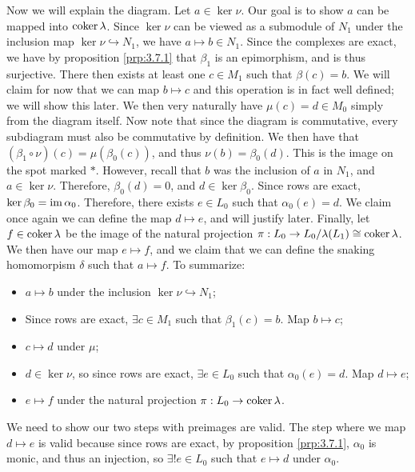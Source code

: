 Now we will explain the diagram. Let $a\in \ker \nu $. Our goal is to show $a$ can be mapped into $\operatorname{coker} \lambda $. Since $\ker \nu $ can be viewed as a submodule of $N_1$ under the inclusion map $\ker \nu \hookrightarrow N_1$, we have $a\mapsto b\in N_1$. Since the complexes are exact, we have by proposition \ref{prp:3.7.1} that $\beta _1$ is an epimorphism, and is thus surjective. There then exists at least one $c\in M_1$ such that $\beta (c)=b$. We will claim for now that we can map $b\mapsto c$ and this operation is in fact well defined; we will show this later. We then very naturally have $\mu (c)=d\in M_0$ simply from the diagram itself. Now note that since the diagram is commutative, every subdiagram must also be commutative by definition. We then have that $(\beta_1\circ \nu) (c)=\mu (\beta _0(c))$, and thus $\nu (b)=\beta _0(d)$. This is the image on the spot marked $*$. However, recall that $b$ was the inclusion of $a$ in $N_1$, and $a\in \ker \nu $. Therefore, $\beta_0(d)=0$, and $d\in \ker \beta _0$. Since rows are exact, $\ker \beta _0= \operatorname{im} \alpha _0$. Therefore, there exists $e\in L_0$ such that  $\alpha _0(e)=d$. We claim once again we can define the map $d\mapsto e$, and will justify later. Finally, let $f\in \operatorname{coker} \lambda $ be the image of the natural projection $\pi : L_0 \to L_0 / \lambda (L_1) \cong \operatorname{coker} \lambda $. We then have our map $e\mapsto f$, and we claim that we can define the snaking homomorpism $\delta$ such that $a\mapsto f$. To summarize:
\begin{itemize}
	\item $a\mapsto b$ under the inclusion $\ker \nu \hookrightarrow N_1$;
	\item  Since rows are exact,  $\exists c\in M_1$ such that $\beta _1(c)=b$. Map $b\mapsto c$;
	\item $c\mapsto d$ under $\mu $;
	\item $d\in \ker \nu $, so since rows are exact, $\exists e\in L_0$ such that $\alpha_0(e)=d$. Map $d\mapsto e$;
	\item $e\mapsto f$ under the natural projection $\pi : L_0 \to \operatorname{coker} \lambda $.
\end{itemize}

We need to show our two steps with preimages are valid. The step where we map $d\mapsto e$ is valid because since rows are exact, by proposition \ref{prp:3.7.1}, $\alpha _0$ is monic, and thus an injection, so $\exists ! e\in L_0$ such that $e\mapsto d$ under $\alpha _0$.

